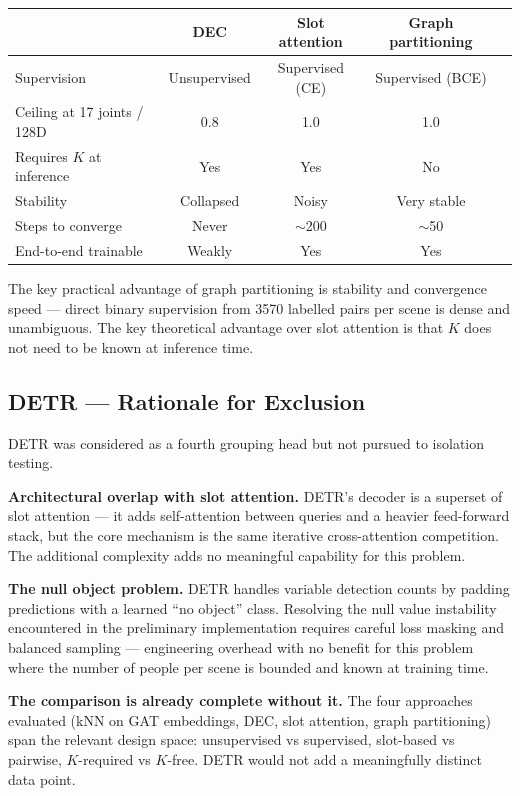 \begin{center}
\begin{tabular}{lcccc}
\toprule
 & DEC & Slot attention & Graph partitioning \\
\midrule
Supervision & Unsupervised & Supervised (CE) & Supervised (BCE) \\
Ceiling at 17 joints / 128D & 0.8 & 1.0 & 1.0 \\
Requires $K$ at inference & Yes & Yes & No \\
Stability & Collapsed & Noisy & Very stable \\
Steps to converge & Never & $\sim$200 & $\sim$50 \\
End-to-end trainable & Weakly & Yes & Yes \\
\bottomrule
\end{tabular}
\end{center}

The key practical advantage of graph partitioning is stability and convergence speed --- direct binary supervision from 3570 labelled pairs per scene is dense and unambiguous. The key theoretical advantage over slot attention is that $K$ does not need to be known at inference time.


\subsection{DETR --- Rationale for Exclusion}

DETR was considered as a fourth grouping head but not pursued to isolation testing.

\textbf{Architectural overlap with slot attention.} DETR's decoder is a superset of slot attention --- it adds self-attention between queries and a heavier feed-forward stack, but the core mechanism is the same iterative cross-attention competition. The additional complexity adds no meaningful capability for this problem.

\textbf{The null object problem.} DETR handles variable detection counts by padding predictions with a learned ``no object'' class. Resolving the null value instability encountered in the preliminary implementation requires careful loss masking and balanced sampling --- engineering overhead with no benefit for this problem where the number of people per scene is bounded and known at training time.

\textbf{The comparison is already complete without it.} The four approaches evaluated (kNN on GAT embeddings, DEC, slot attention, graph partitioning) span the relevant design space: unsupervised vs supervised, slot-based vs pairwise, $K$-required vs $K$-free. DETR would not add a meaningfully distinct data point.


